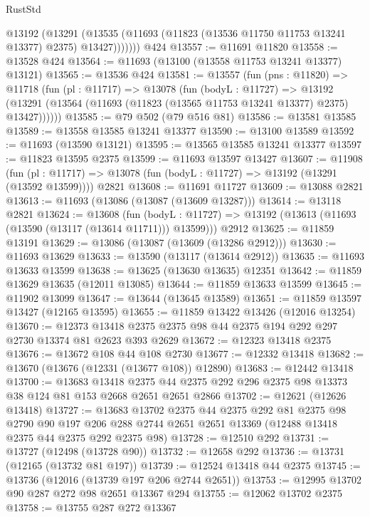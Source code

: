 \begin{lexlean}{RustStd}
\begin{coremodule}
          @13192
            (@13291
              (@13535 (@11693 (@11823 (@13536 @11750 @11753 @13241 @13377) @2375) @13427)))))))
    @424
@13557 := @11691 @11820
@13558 := @13528 @424
@13564 := @11693 (@13100 (@13558 @11753 @13241 @13377) @13121)
@13565 := @13536 @424
@13581 := @13557
    (fun (pns : @11820) =>
    @11718
      (fun (pl : @11717) =>
      @13078
        (fun (bodyL : @11727) =>
        @13192 (@13291 (@13564 (@11693 (@11823 (@13565 @11753 @13241 @13377) @2375) @13427))))))
@13585 := @79 @502 (@79 @516 @81)
@13586 := @13581 @13585
@13589 := @13558 @13585 @13241 @13377
@13590 := @13100 @13589
@13592 := @11693 (@13590 @13121)
@13595 := @13565 @13585 @13241 @13377
@13597 := @11823 @13595 @2375
@13599 := @11693 @13597 @13427
@13607 := @11908
    (fun (pl : @11717) => @13078 (fun (bodyL : @11727) => @13192 (@13291 (@13592 @13599))))
    @2821
@13608 := @11691 @11727
@13609 := @13088 @2821
@13613 := @11693 (@13086 (@13087 (@13609 @13287)))
@13614 := @13118 @2821
@13624 := @13608
    (fun (bodyL : @11727) => @13192 (@13613 (@11693 (@13590 (@13117 (@13614 @11711))) @13599)))
    @2912
@13625 := @11859 @13191
@13629 := @13086 (@13087 (@13609 (@13286 @2912)))
@13630 := @11693 @13629
@13633 := @13590 (@13117 (@13614 @2912))
@13635 := @11693 @13633 @13599
@13638 := @13625 (@13630 @13635) @12351
@13642 := @11859 @13629 @13635 (@12011 @13085)
@13644 := @11859 @13633 @13599
@13645 := @11902 @13099
@13647 := @13644 (@13645 @13589)
@13651 := @11859 @13597 @13427 (@12165 @13595)
@13655 := @11859 @13422 @13426 (@12016 @13254)
@13670 := @12373 @13418 @2375 @2375 @98 @44 @2375 @194 @292 @297 @2730 @13374 @81 @2623 @393 @2629
@13672 := @12323 @13418 @2375
@13676 := @13672 @108 @44 @108 @2730
@13677 := @12332 @13418
@13682 := @13670 (@13676 (@12331 (@13677 @108)) @12890)
@13683 := @12442 @13418
@13700 := @13683
    @13418
    @2375
    @44
    @2375
    @292
    @296
    @2375
    @98
    @13373
    @38
    @124
    @81
    @153
    @2668
    @2651
    @2651
    @2866
@13702 := @12621 (@12626 @13418)
@13727 := @13683
    @13702
    @2375
    @44
    @2375
    @292
    @81
    @2375
    @98
    @2790
    @90
    @197
    @206
    @288
    @2744
    @2651
    @2651
    @13369
    (@12488 @13418 @2375 @44 @2375 @292 @2375 @98)
@13728 := @12510 @292
@13731 := @13727 (@12498 (@13728 @90))
@13732 := @12658 @292
@13736 := @13731 (@12165 (@13732 @81 @197))
@13739 := @12524 @13418 @44 @2375
@13745 := @13736 (@12016 (@13739 @197 @206 @2744 @2651))
@13753 := @12995 @13702 @90 @287 @272 @98 @2651 @13367 @294
@13755 := @12062 @13702 @2375
@13758 := @13755 @287 @272 @13367

\end{coremodule}
\end{lexlean}
